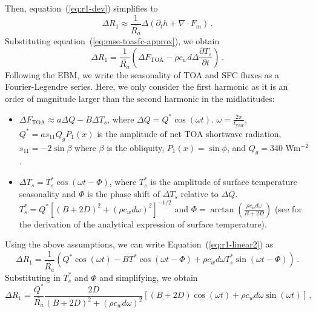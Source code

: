\documentclass{ametsocV5}
\begin{document}
 Then, equation~(\ref{eq:r1-dev}) simplifies to
\begin{equation} \label{eq:r1-term1}
  \Delta R_{1} \approx \frac{1}{\overline{R_{a}}}\Delta(\partial_t h + \nabla\cdot F_{m}) \, .
\end{equation}
Substituting equation~(\ref{eq:mse-toasfc-approx}), we obtain
\begin{equation} \label{eq:r1-linear2}
  \Delta R_{1} = \frac{1}{\overline{R_{a}}}\left(\Delta F_{\mathrm{TOA}}-\rho c_{w} d \Delta\frac{\partial T_{s}}{\partial t}\right) \, .
\end{equation}
Following the \cite{rose2017} EBM, we write the seasonality of TOA and SFC fluxes as a Fourier-Legendre series. Here, we only consider the first harmonic as it is an order of magnitude larger than the second harmonic in the midlatitudes:
    \begin{itemize}
      \item $\Delta F_{\mathrm{TOA}} \approx a\Delta Q - B\Delta T_{s}$, where $\Delta Q = Q^{*}\cos(\omega t)$. $\omega=\frac{2\pi}{t_{\mathrm{year}}}$, $Q^{*}=as_{11}Q_{g}P_{1}(x)$ is the amplitude of net TOA shortwave radiation, $s_{11}=-2\sin{\beta}$ where $\beta$ is the obliquity, $P_1(x) = \sin\phi$, and $Q_{g}=340$ Wm$^{-2}$. 
      \item $\Delta T_{s} = T_{s}^{*}\cos(\omega t - \Phi)$, where $T_{s}^{*}$ is the amplitude of surface temperature seasonality and $\Phi$ is the phase shift of $\Delta T_{s}$ relative to $\Delta Q$. $T_{s}^{*}=Q^{*}\left[(B+2D)^{2}+(\rho c_w d \omega)^{2}\right]^{-1/2}$ and $\Phi=\arctan\left(\frac{\rho c_w d \omega}{B+2D}\right)$ (see \cite{rose2017} for the derivation of the analytical expression of surface temperature).
    \end{itemize}
  Using the above assumptions, we can write Equation~(\ref{eq:r1-linear2}) as
  \begin{equation} \label{eq:r1-linear3}
    \Delta R_{1} = \frac{1}{\overline{R_{a}}}\left(Q^{*}\cos(\omega t) -BT^{*}\cos(\omega t - \Phi)+\rho c_{w} d \omega T_{s}^{*}\sin(\omega t - \Phi) \right) \, .
  \end{equation}
  Substituting in $T_{s}^{*}$ and $\Phi$ and simplifying, we obtain
  \begin{equation} \label{eq:r1-linear4-deriv}
    \Delta R_{1} = \frac{Q^{*}}{\overline{R_{a}}}\frac{2D}{(B+2D)^{2}+(\rho c_w d \omega)^{2}}\left[(B+2D)\cos(\omega t)+\rho c_w d \omega \sin(\omega t)\right] \, ,
  \end{equation}
\end{document}
